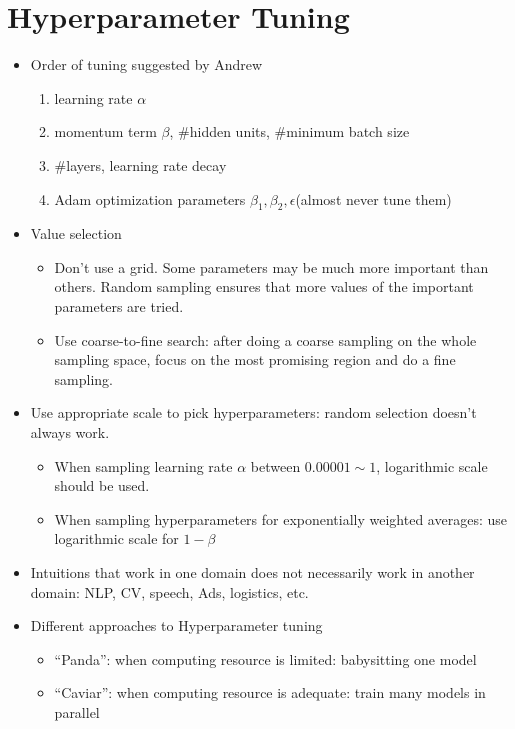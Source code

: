 \section{Hyperparameter Tuning}
\begin{itemize}
  \item Order of tuning suggested by Andrew
    \begin{enumerate} 
      \item learning rate $\alpha$
      \item momentum term $\beta$, \#hidden units, \#minimum batch size 
      \item \#layers, learning rate decay
      \item Adam optimization parameters $\beta_1, \beta_2, \epsilon$(almost never tune them)
  \end{enumerate}
  \item Value selection
    \begin{itemize}
      \item Don't use a grid. Some parameters may be much more important than others. Random sampling ensures that more values of the important parameters are tried.
      \item Use coarse-to-fine search: after doing a coarse sampling on the whole sampling space, focus on the most promising region and do a fine sampling.
    \end{itemize}
  \item Use appropriate scale to pick hyperparameters: random selection doesn't always work.
    \begin{itemize}
      \item When sampling learning rate $\alpha$ between $0.00001\sim 1$, logarithmic scale should be used.
      \item When sampling hyperparameters for exponentially weighted averages: use logarithmic scale for $1-\beta$
    \end{itemize}
  \item Intuitions that work in one domain does not necessarily work in another domain: NLP, CV, speech, Ads, logistics, etc.
  \item Different approaches to Hyperparameter tuning
    \begin{itemize}
      \item ``Panda'': when computing resource is limited: babysitting one model
      \item ``Caviar'': when computing resource is adequate: train many models in parallel
    \end{itemize}
\end{itemize}
